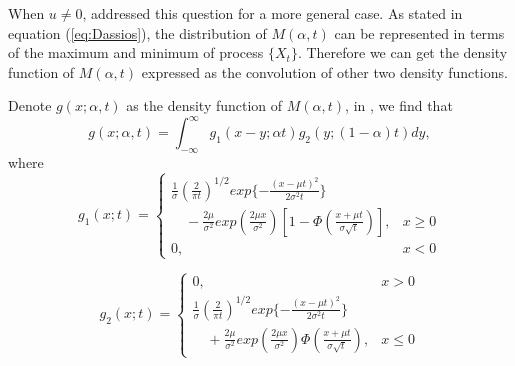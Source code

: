 \documentclass[11pt]{book}
\begin{document}
When $u \neq 0$,  \cite{Dassios1995} addressed this question for a more general case.  As stated in equation (\ref{eq:Dassios}), the distribution of $M(\alpha , t)$ can be represented in terms of the maximum and minimum of process $\{X_t\}$. Therefore we can get the density function of $M(\alpha, t)$ expressed as the convolution of other two density functions.

Denote $g(x; \alpha , t)$ as the density function of $M(\alpha , t)$, in \cite{Dassios1995}, we find that
\begin{equation}\label{eq:fulldensity}
g(x; \alpha , t) = \int^{\infty}_{-\infty} g_1 (x-y; \alpha t) g_2 (y; (1-\alpha) t)dy ,
\end{equation}
where
\begin{equation}
g_1 (x;t) = \begin{cases}
\frac{1}{\sigma}({\frac{2}{\pi t}})^{1/2}exp\{-\frac{(x-\mu t)^2}{2\sigma ^2 t}\} \\
\quad - \frac{2\mu}{\sigma ^2} exp(\frac{2\mu x}{\sigma ^2})[1- \Phi (\frac{x+\mu t}{\sigma \sqrt{t}})], & x \geq 0 \\
0 , & x  < 0 
\end{cases}
\end{equation}

\begin{equation}
g_2 (x;t) = \begin{cases}
0, & x > 0 \\
\frac{1}{\sigma}({\frac{2}{\pi t}})^{1/2}exp\{-\frac{(x-\mu t)^2}{2\sigma ^2 t}\} \\
\quad + \frac{2\mu}{\sigma ^2} exp(\frac{2\mu x}{\sigma ^2}) \Phi (\frac{x+\mu t}{\sigma \sqrt{t}}) , & x \leq 0
\end{cases}
\end{equation}
\end{document}
